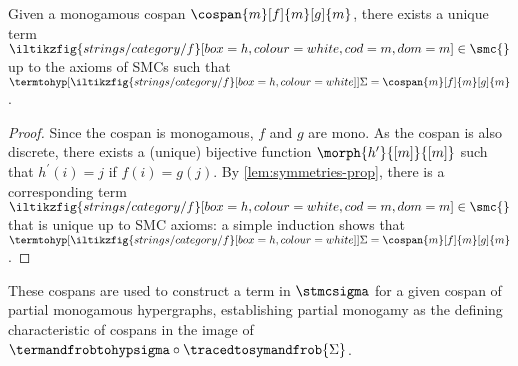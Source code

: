 \begin{lemma}\label{lem:monog-discrete-cospan}
    Given a monogamous cospan \(\cospan{m}[f]{m}[g]{m}\), there exists a unique
    term \(
        \iltikzfig{strings/category/f}[box=h,colour=white,cod=m,dom=m]
        \in \smc{}
    \) up to the axioms of SMCs such that \(
        \termtohyp[\iltikzfig{strings/category/f}[box=h,colour=white]]{\Sigma}
        =
        \cospan{m}[f]{m}[g]{m}
    \).
\end{lemma}
\begin{proof}
    Since the cospan is monogamous, \(f\) and \(g\) are mono.
    As the cospan is also discrete, there exists a (unique) bijective
    function \(\morph{h^\prime}{[m]}{[m]}\) such that \(h^\prime(i) = j\) if
    \(f(i) = g(j)\).
    By \cref{lem:symmetries-prop}, there is a corresponding term \(
        \iltikzfig{strings/category/f}[box=h,colour=white,cod=m,dom=m]
        \in \smc{}
    \) that is unique up to SMC axioms: a simple induction shows that \(
        \termtohyp[\iltikzfig{strings/category/f}[box=h,colour=white]]{\Sigma}
        =
        \cospan{m}[f]{m}[g]{m}
    \).
\end{proof}

These cospans are used to construct a term in \(\stmcsigma\) for a given cospan
of partial monogamous hypergraphs, establishing partial monogamy as the
defining characteristic of cospans in the image of \(
    \termandfrobtohypsigma \circ \tracedtosymandfrob{\Sigma}
\).

